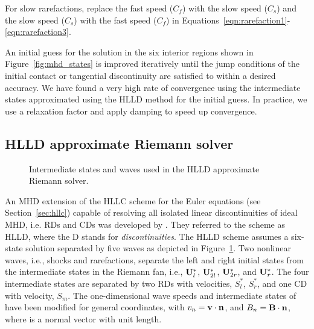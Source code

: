 For slow rarefactions, replace the fast speed ($C_f$) with the slow speed ($C_s$) and the slow speed ($C_s$) with the fast speed ($C_f$) in Equations~\eqref{eqn:rarefaction1}-\eqref{eqn:rarefaction3}.  

An initial guess for the solution in the six interior regions shown in Figure~\ref{fig:mhd_states} is improved iteratively until the jump conditions of the initial contact or tangential discontinuity are satisfied to within a desired accuracy.  We have found a very high rate of convergence using the intermediate states approximated using the HLLD method for the initial guess. In practice, we use a relaxation factor and apply damping to speed up convergence. 

\subsection[HLLD approximate Riemann solver]{HLLD approximate Riemann solver}
\label{sec:hlld}

\begin{figure}[htbp]
\begin{center}

\end{center}
\caption{Intermediate states and waves used in the HLLD approximate Riemann solver.}
\label{fig:hlld_rstates}
\end{figure}

An MHD extension of the HLLC scheme for the Euler equations (see Section~\ref{sec:hllc}) capable of resolving all isolated linear discontinuities of ideal MHD, i.e. RDs and CDs was developed by \citet{Miyoshi:2005}.  They referred to the scheme as HLLD, where the D stands for \emph{discontinuities}.  The HLLD scheme assumes a six-state solution separated by five waves as depicted in Figure~\ref{fig:hlld_rstates}.  Two nonlinear waves, i.e., shocks and rarefactions, separate the left and right initial states from the intermediate states in the Riemann fan, i.e., $\mathbf{U}_{l}^*$, $\mathbf{U}_{2l}^*$, $\mathbf{U}_{2r}^*$, and $\mathbf{U}_{r}^*$.  The four intermediate states are separated by two RDs with velocities, $S^*_l$, $S^*_r$, and one CD with velocity, $S_m$.  The one-dimensional wave speeds and intermediate states of \citep{Miyoshi:2005} have been modified for general coordinates, with $v_n = \mathbf{v}\cdot\mathbf{n}$, and $B_n = \mathbf{B}\cdot\mathbf{n}$, where   is a normal vector with unit length.  

